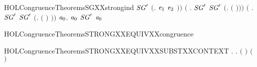 \begin{SaveVerbatim}{HOLCongruenceTheoremsSGXXstrongind}
            \ensuremath{\HOLBoundVar{SG}\sp{\prime}} \ensuremath{(}\HOLTokenLambda{}. \ensuremath{\HOLBoundVar{e}\sb{\mathrm{1}}}  \HOLSymConst{\ensuremath{\mid}} \ensuremath{\HOLBoundVar{e}\sb{\mathrm{2}}} \ensuremath{)}\ensuremath{)} \HOLSymConst{\HOLTokenConj{}}
       \ensuremath{(}\HOLSymConst{\HOLTokenForall{}} .   \HOLSymConst{\HOLTokenConj{}} \ensuremath{\HOLBoundVar{SG}\sp{\prime}}  \HOLSymConst{\HOLTokenImp{}} \ensuremath{\HOLBoundVar{SG}\sp{\prime}} \ensuremath{(}\HOLTokenLambda{}.   \ensuremath{(} \ensuremath{)}\ensuremath{)}\ensuremath{)} \HOLSymConst{\HOLTokenConj{}}
       \ensuremath{(}\HOLSymConst{\HOLTokenForall{}} .   \HOLSymConst{\HOLTokenConj{}} \ensuremath{\HOLBoundVar{SG}\sp{\prime}}  \HOLSymConst{\HOLTokenImp{}} \ensuremath{\HOLBoundVar{SG}\sp{\prime}} \ensuremath{(}\HOLTokenLambda{}.  \ensuremath{(} \ensuremath{)} \ensuremath{)}\ensuremath{)} \HOLSymConst{\HOLTokenImp{}}
       \HOLSymConst{\HOLTokenForall{}}\ensuremath{\HOLBoundVar{a}\sb{\mathrm{0}}}.  \ensuremath{\HOLBoundVar{a}\sb{\mathrm{0}}} \HOLSymConst{\HOLTokenImp{}} \ensuremath{\HOLBoundVar{SG}\sp{\prime}} \ensuremath{\HOLBoundVar{a}\sb{\mathrm{0}}}
\end{SaveVerbatim}
\newcommand{\HOLCongruenceTheoremsSGXXstrongind}{\UseVerbatim{HOLCongruenceTheoremsSGXXstrongind}}
\begin{SaveVerbatim}{HOLCongruenceTheoremsSTRONGXXEQUIVXXcongruence}
\HOLTokenTurnstile{}  
\end{SaveVerbatim}
\newcommand{\HOLCongruenceTheoremsSTRONGXXEQUIVXXcongruence}{\UseVerbatim{HOLCongruenceTheoremsSTRONGXXEQUIVXXcongruence}}
\begin{SaveVerbatim}{HOLCongruenceTheoremsSTRONGXXEQUIVXXSUBSTXXCONTEXT}
\HOLTokenTurnstile{} \HOLSymConst{\HOLTokenForall{}} .
          \HOLSymConst{\HOLTokenImp{}}
       \HOLSymConst{\HOLTokenForall{}}.   \HOLSymConst{\HOLTokenImp{}}  \ensuremath{(} \ensuremath{)} \ensuremath{(} \ensuremath{)}
\end{SaveVerbatim}
